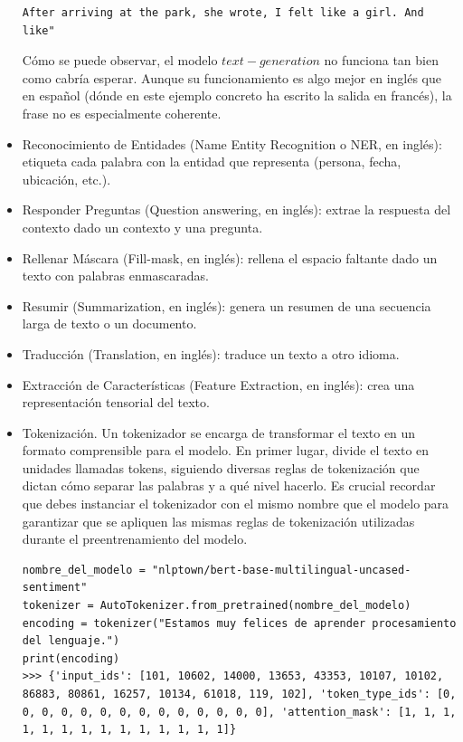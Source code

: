 \begin{itemize}
\begin{lstlisting}[style=SpyderStyle, caption={Generación de texto con transformers}, captionpos=b, label={lst:python},breaklines = true]
After arriving at the park, she wrote, I felt like a girl. And like"
\end{lstlisting}

Cómo se puede observar, el modelo $text-generation$ no funciona tan bien como cabría esperar. Aunque su funcionamiento es algo mejor en inglés que en español (dónde en este ejemplo concreto ha escrito la salida en francés), la frase no es especialmente coherente. 

	\item Reconocimiento de Entidades (Name Entity Recognition o NER, en inglés): etiqueta cada palabra con la entidad que representa (persona, fecha, ubicación, etc.).
	\item Responder Preguntas (Question answering, en inglés): extrae la respuesta del contexto dado un contexto y una pregunta.
	\item Rellenar Máscara (Fill-mask, en inglés): rellena el espacio faltante dado un texto con palabras enmascaradas.
	\item Resumir (Summarization, en inglés): genera un resumen de una secuencia larga de texto o un documento.
	\item Traducción (Translation, en inglés): traduce un texto a otro idioma.
	\item Extracción de Características (Feature Extraction, en inglés): crea una representación tensorial del texto.
	\item Tokenización. Un tokenizador se encarga de transformar el texto en un formato comprensible para el modelo. En primer lugar, divide el texto en unidades llamadas tokens, siguiendo diversas reglas de tokenización que dictan cómo separar las palabras y a qué nivel hacerlo. Es crucial recordar que debes instanciar el tokenizador con el mismo nombre que el modelo para garantizar que se apliquen las mismas reglas de tokenización utilizadas durante el preentrenamiento del modelo.
	
\begin{lstlisting}[style=SpyderStyle, caption={AutoTokenizer con transformers}, captionpos=b, label={lst:python},breaklines = true]
nombre_del_modelo = "nlptown/bert-base-multilingual-uncased-sentiment"
tokenizer = AutoTokenizer.from_pretrained(nombre_del_modelo)
encoding = tokenizer("Estamos muy felices de aprender procesamiento del lenguaje.")
print(encoding)
>>> {'input_ids': [101, 10602, 14000, 13653, 43353, 10107, 10102, 86883, 80861, 16257, 10134, 61018, 119, 102], 'token_type_ids': [0, 0, 0, 0, 0, 0, 0, 0, 0, 0, 0, 0, 0, 0], 'attention_mask': [1, 1, 1, 1, 1, 1, 1, 1, 1, 1, 1, 1, 1, 1]}
\end{lstlisting}
	

\end{itemize}

